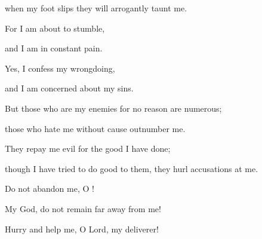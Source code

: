 {\par }{\Q when my foot
slips
they will arrogantly taunt me.
\par }{\Q {}For
I
am about
to stumble,
\par }{\Q and I am in
constant
pain.
\par }{\Q {}Yes,
I confess
my wrongdoing,
\par }{\Q and I am concerned
about my sins.
\par }{\Q {}But those who are my enemies
for no reason are numerous;
\par }{\Q those who hate
me without cause outnumber me.
\par }{\Q {}They repay
me evil
for the good I have done;
\par }{\Q though I have tried to do good
to them,
they hurl accusations
at me.
\par }{\Q {}Do not
abandon
me, O
{}!
\par }{\Q My God,
do not
remain far
away from me!
\par }{\Q {}Hurry
and help
me, O Lord,
my deliverer!


\par }
